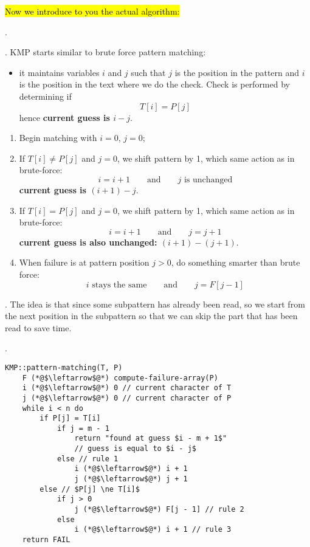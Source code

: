 \documentclass{article}
\begin{document}
\hl{Now we introduce to you the actual algorithm:} 

\begin{algo}[].
    \begin{comm}[].
        KMP starts similar to brute force pattern matching: \begin{itemize}
            \item it maintains variables $i$ and $j$ such that $j$ is the position in the pattern and $i$ is the position in the text where we do the check. Check is performed by determining if 
            \[ T[i] = P[j] \] 
            hence \textbf{current guess is $i - j$}. 
        \end{itemize} 
    \end{comm}
    \begin{enumerate}
        \item Begin matching with $i = 0$, $j = 0$; 
        \item If $T[i] \neq P[j]$ and $j = 0$, we shift pattern by 1, which same action as in brute-force: 
        \[ i = i + 1 \qquad \text{and} \qquad j \text{ is unchanged} \] 
        \textbf{current guess is $(i + 1) - j$}. 
        \item If $T[i] = P[j]$ and $j = 0$, we shift pattern by 1, which same action as in brute-force: 
        \[ i = i + 1 \qquad \text{and} \qquad j = j + 1 \] 
        \textbf{current guess is also unchanged: $(i + 1) - (j + 1)$}. 
        \item When failure is at pattern position $j > 0$, do something smarter than brute force: 
        \[ i \text{ stays the same} \qquad \text{and} \qquad j = F[j-1] \]
    \end{enumerate}
    \begin{discovery}[].
        The idea is that since some subpattern has already been read, so we start from the next position in the subpattern so that we can skip the part that has been read to save time. 
    \end{discovery}
\end{algo}

\newpage

\begin{codes}[].
    \begin{lstlisting}[style=cppstyle]
    KMP::pattern-matching(T, P)
    F (*@$\leftarrow$@*) compute-failure-array(P)
    i (*@$\leftarrow$@*) 0 // current character of T
    j (*@$\leftarrow$@*) 0 // current character of P
    while i < n do
        if P[j] = T[i]
            if j = m - 1
                return "found at guess $i - m + 1$"
                // guess is equal to $i - j$
            else // rule 1
                i (*@$\leftarrow$@*) i + 1
                j (*@$\leftarrow$@*) j + 1
        else // $P[j] \ne T[i]$
            if j > 0
                j (*@$\leftarrow$@*) F[j - 1] // rule 2
            else
                i (*@$\leftarrow$@*) i + 1 // rule 3
    return FAIL
    \end{lstlisting}
\end{codes}
\end{document}

